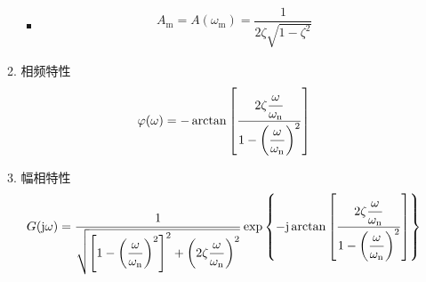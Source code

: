 \begin{enumerate}[1.]
\begin{enumerate}[(1) ]
\begin{itemize}
			\item {}
			\begin{align}
				A_\text{m} = A(\omega_\text{m}) = \dfrac{1}{2 \zeta \sqrt{1-\zeta^2}}
				\label{谐振峰值}
			\end{align}
			
			
		\end{itemize}
		\item 相频特性
		\begin{align}
			\varphi(\omega) = -\arctan \left[\dfrac{2 \zeta \dfrac{\omega}{\omega_{\rm{n}}}}{1 - \left(\dfrac{\omega}{\omega_{\rm{n}}}\right)^2}\right]
		\end{align}
		\vspace*{-1em}
		
		\item 幅相特性
		\vspace*{-0.5em}
		\begin{align}
			G(\text{j} \omega) = \dfrac{1}{\sqrt{\left[1 - \left(\dfrac{\omega}{\omega_{\rm{n}}}\right)^2\right]^2 + \left(2 \zeta \dfrac{\omega}{\omega_{\rm{n}}}\right)^2}} \exp\left\lbrace-\text{j} \arctan \left[\dfrac{2 \zeta \dfrac{\omega}{\omega_{\rm{n}}}}{1 - \left(\dfrac{\omega}{\omega_{\rm{n}}}\right)^2}\right]\right\rbrace
		\end{align}
		\vspace*{-3em}
		

\end{enumerate}
\end{enumerate}
